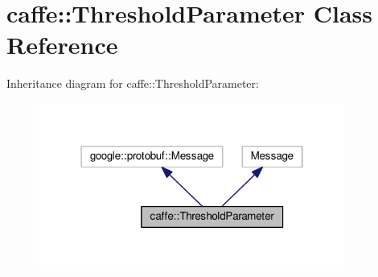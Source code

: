 \hypertarget{classcaffe_1_1_threshold_parameter}{}\section{caffe\+:\+:Threshold\+Parameter Class Reference}
\label{classcaffe_1_1_threshold_parameter}


Inheritance diagram for caffe\+:\+:Threshold\+Parameter\+:
\nopagebreak
\begin{figure}[H]
\begin{center}
\leavevmode
\includegraphics[width=286pt]{classcaffe_1_1_threshold_parameter__inherit__graph}
\end{center}
\end{figure}
